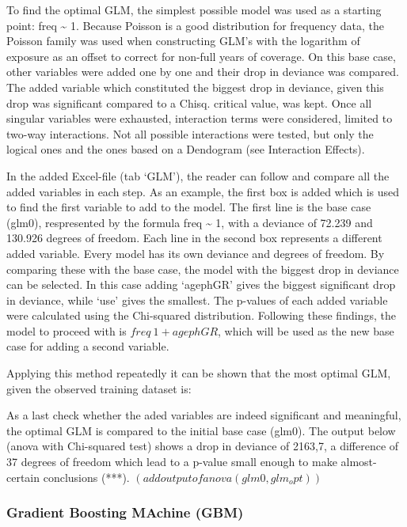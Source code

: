 \documentclass[
  12pt,
]{article}
\begin{document}
To find the optimal GLM, the simplest possible model was used as a
starting point: freq \textasciitilde{} 1. Because Poisson is a good
distribution for frequency data, the Poisson family was used when
constructing GLM's with the logarithm of exposure as an offset to
correct for non-full years of coverage. On this base case, other
variables were added one by one and their drop in deviance was compared.
The added variable which constituted the biggest drop in deviance, given
this drop was significant compared to a Chisq. critical value, was kept.
Once all singular variables were exhausted, interaction terms were
considered, limited to two-way interactions. Not all possible
interactions were tested, but only the logical ones and the ones based
on a Dendogram (see Interaction Effects).

In the added Excel-file (tab `GLM'), the reader can follow and compare
all the added variables in each step. As an example, the first box is
added which is used to find the first variable to add to the model. The
first line is the base case (glm0), respresented by the formula freq
\textasciitilde{} 1, with a deviance of 72.239 and 130.926 degrees of
freedom. Each line in the second box represents a different added
variable. Every model has its own deviance and degrees of freedom. By
comparing these with the base case, the model with the biggest drop in
deviance can be selected. In this case adding `agephGR' gives the
biggest significant drop in deviance, while `use' gives the smallest.
The p-values of each added variable were calculated using the
Chi-squared distribution. Following these findings, the model to proceed
with is \(freq ~ 1 + agephGR\), which will be used as the new base case
for adding a second variable.

Applying this method repeatedly it can be shown that the most optimal
GLM, given the observed training dataset is:

As a last check whether the aded variables are indeed significant and
meaningful, the optimal GLM is compared to the initial base case (glm0).
The output below (anova with Chi-squared test) shows a drop in deviance
of 2163,7, a difference of 37 degrees of freedom which lead to a p-value
small enough to make almost-certain conclusions (***).
\((add output of anova(glm0,glm_opt))\)

\hypertarget{gradient-boosting-machine-gbm}{%
\subsubsection{Gradient Boosting MAchine
(GBM)}\label{gradient-boosting-machine-gbm}}
\end{document}
